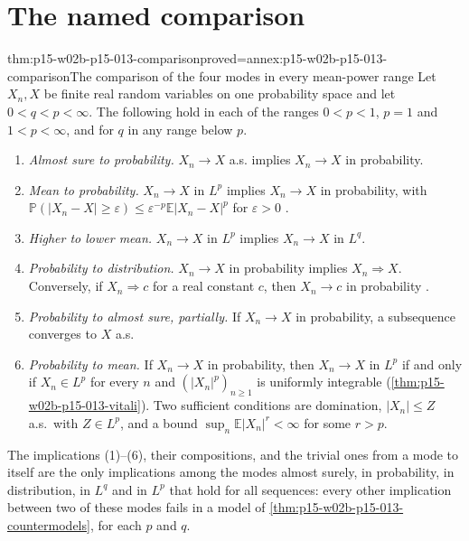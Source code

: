 \section{The named comparison}
\label{sec:p15-w02b-p15-013-comparison}

\begin{hbtheorem}{thm:p15-w02b-p15-013-comparison}{proved=annex:p15-w02b-p15-013-comparison}{The comparison of the four modes in every mean-power range}
Let \(X_n,X\) be finite real random variables on one probability space
and let \(0<q<p<\infty\). The following hold in each of the ranges
\(0<p<1\), \(p=1\) and \(1<p<\infty\), and for \(q\) in any range
below \(p\).
\begin{enumerate}
\item \emph{Almost sure to probability.} \(X_n\to X\) a.s. implies
      \(X_n\to X\) in probability.
\item \emph{Mean to probability.} \(X_n\to X\) in \(L^p\) implies
      \(X_n\to X\) in probability, with
      \(\mathbb P(|X_n-X|\geq\varepsilon)\leq
      \varepsilon^{-p}\mathbb E|X_n-X|^p\) for \(\varepsilon>0\)
      \cite[Lemma~2.2.2, p.~57]{DurrettPTEAuthor2019}.
\item \emph{Higher to lower mean.} \(X_n\to X\) in \(L^p\) implies
      \(X_n\to X\) in \(L^q\).
\item \emph{Probability to distribution.} \(X_n\to X\) in probability
      implies \(X_n\Rightarrow X\). Conversely, if \(X_n\Rightarrow c\)
      for a real constant \(c\), then \(X_n\to c\) in probability
      \cite[Exercise~3.2.12, p.~124]{DurrettPTEAuthor2019}.
\item \emph{Probability to almost sure, partially.} If \(X_n\to X\) in
      probability, a subsequence converges to \(X\) a.s.
\item \emph{Probability to mean.} If \(X_n\to X\) in probability, then
      \(X_n\to X\) in \(L^p\) if and only if \(X_n\in L^p\) for every
      \(n\) and \((|X_n|^p)_{n\geq1}\) is uniformly integrable
      (\cref{thm:p15-w02b-p15-013-vitali}). Two sufficient conditions
      are domination, \(|X_n|\leq Z\) a.s.\ with \(Z\in L^p\), and a
      bound \(\sup_n\mathbb E|X_n|^r<\infty\) for some \(r>p\).
\end{enumerate}
The implications (1)--(6), their compositions, and the trivial ones
from a mode to itself are the only implications among the modes
almost surely, in probability, in distribution, in \(L^q\) and in
\(L^p\) that hold for all sequences: every other implication between
two of these modes fails in a model of
\cref{thm:p15-w02b-p15-013-countermodels}, for each \(p\) and \(q\).
\end{hbtheorem}

